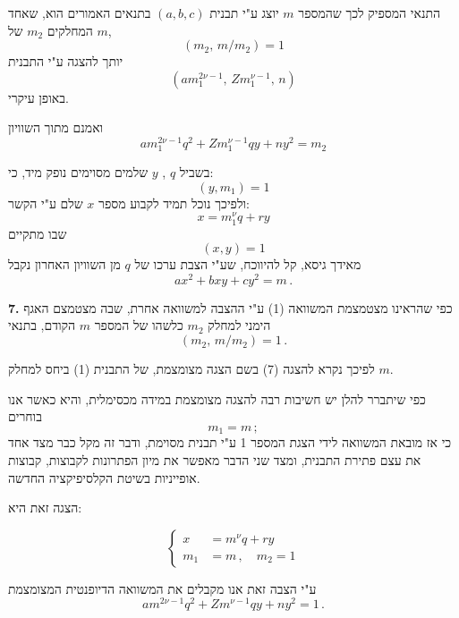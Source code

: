 \noindent התנאי המספיק לכך שהמספר $m$ יוצג ע"י תבנית $(a,b,c)$ בתנאים האמורים הוא, שאחד המחלקים $m_2$ של $m$,
\[ (m_2,\, m/m_2) = 1 \]
\noindent יותך להצגה ע"י התבנית
\[ (am_1^{2\nu-1},\, Zm_1^{\nu-1},\, n) \]
\noindent באופן עיקרי.

\noindent ואמנם מתוך השוויון
\[ am_1^{2\nu-1}q^2 + Zm_1^{\nu-1}qy + ny^2 = m_2 \]

\noindent בשביל $q$ , $y$ שלמים מסוימים נופק מיד, כי:
\[ (y,m_1) = 1 \]
\noindent ולפיכך נוכל תמיד לקבוע מספר $x$ שלם ע"י הקשר:
\[ x = m_1^{\nu}q + ry \]
\noindent שבו מתקיים
\[ (x,y) = 1 \]
\noindent מאידך גיסא, קל להיווכח, שע"י הצבת ערכו של $q$ מן השוויון האחרון נקבל
\[ ax^2 + bxy + cy^2 = m \, . \]

\noindent\textbf{7.} כפי שהראינו מצטמצמת המשוואה (1) ע"י ההצבה למשוואה אחרת, שבה מצטמצם האגף הימני למחלק $m_2$ כלשהו של המספר $m$ הקודם, בתנאי
\[ (m_2,\, m/m_2) = 1 \, . \]

\noindent לפיכך נקרא להצגה (7) בשם הצגה מצומצמת, של התבנית (1) ביחס למחלק $m$.

\noindent כפי שיתברר להלן יש חשיבות רבה להצגה מצומצמת במידה מכסימלית, והיא כאשר אנו בוחרים
\[ m_1 = m \, ; \]
\noindent כי אז מובאת המשוואה לידי הצגת המספר 1 ע"י תבנית מסוימת, ודבר זה מקל כבר מצד אחד את עצם פתירת התבנית, ומצד שני הדבר מאפשר את מיון הפתרונות לקבוצות, קבוצות אופייניות בשיטת הקלסיפיקציה החדשה.

\noindent הצגה זאת היא:

\[ \left\{ \begin{aligned} x &= m^{\nu}q + ry \\ m_1 &= m \, , \quad m_2 = 1 \end{aligned} \right. \tag{22} \]

\noindent ע"י הצבה זאת אנו מקבלים את המשוואה הדיופנטית המצומצמת
\[ am^{2\nu-1}q^2 + Zm^{\nu-1}qy + ny^2 = 1 \, . \tag{23} \]

